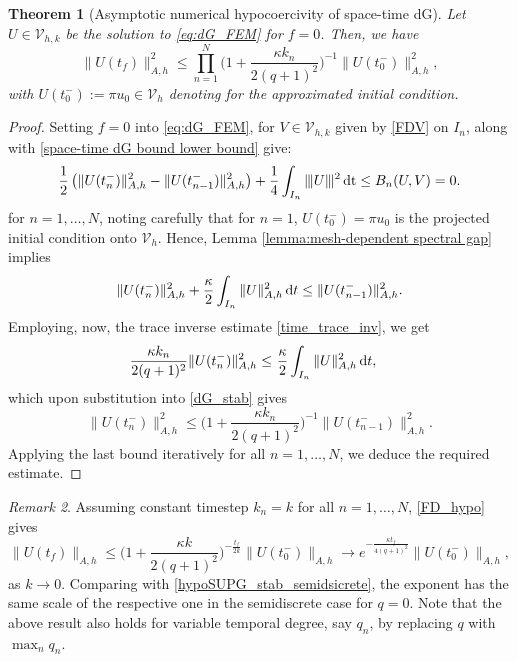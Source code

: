 \documentclass{amsart}
\newcommand{\norm}[2]{\|{#1}\|_{{#2}}}
\newcommand{\ud}{\,{\rm d}}
\newcommand{\ndg}[1]{|\kern-.03cm \|{#1}|\kern-.03cm \|}
\newcommand{\dt}{\,{\rm dt}}
\newtheorem{theorem}{Theorem}[section]
\theoremstyle{definition}
\theoremstyle{remark}
\newtheorem{remark}[theorem]{Remark}
\numberwithin{equation}{section}
\begin{document}
\begin{theorem}[Asymptotic numerical hypocoercivity of space-time dG]\label{thm:discreteEquilibriation}
	Let $U \in  {\mathcal{V}}_{h,k}$ be the solution to  \eqref{eq:dG_FEM} for $f=0$. Then, we have
    \begin{equation}\label{FD_hypo}
        \norm{U(t_f)}{A,h}^2\le \prod_{n=1}^N	\Big(1+\frac{\kappa	k_n}{2 (q+1)^2}	\Big)^{-1}\norm{U(t_{0}^-)}{A,h}^2,
    \end{equation}
   with  $U(t_0^-):=\pi u_0\in  {\mathcal{V}}_h$ denoting for the approximated initial condition.
\end{theorem}
\begin{proof}
Setting $f=0$  into  \eqref{eq:dG_FEM}, for $V\in  {\mathcal{V}}_{h,k}$ given by  \eqref{FDV} on $I_n$, along with \eqref{space-time dG bound lower bound} give:
\begin{equation}\label{dG_coer}
	\frac{1}{2}\left(
	\norm{U(t_n^-)}{A,h}^2  -	\norm{U(t_{n-1}^-)}{A,h}^2  \right)
	+ \frac{1}{4}\int_{I_n} \ndg{U}^2 \dt \leq B_n(U,V) = 0.
\end{equation}
for $n=1,\dots,N$, noting carefully that for $n=1$, $U(t_0^-)=\pi u_0$ is the projected initial condition onto $ {\mathcal{V}}_h$. Hence, Lemma \ref{lemma:mesh-dependent spectral gap} implies
\begin{equation}\label{dG_stab}
\norm{U(t_n^-)}{A,h}^2+\frac{\kappa}{2}\int _{I_n}\norm{U}{A,h}^2\ud t
\le \norm{U(t_{n-1}^-)}{A,h}^2.
\end{equation}
Employing, now, the trace inverse estimate \eqref{time_trace_inv}, we get
\[
\begin{aligned}
\frac{\kappa	k_n}{2 (q+1)^2}\norm{U(t_{n}^-)}{A,h}^2
	\le &\ \frac{\kappa}{2}\int _{I_n}\norm{U}{A,h}^2\ud t,
\end{aligned}
\]
which upon substitution into \eqref{dG_stab} gives
\[
\norm{U(t_n^-)}{A,h}^2\le \Big(1+\frac{\kappa	k_n}{2(q+1)^2} \Big)^{-1}\norm{U(t_{n-1}^-)}{A,h}^2.
\]
Applying the last bound iteratively for all $n=1,\dots,N$, we deduce the required estimate.
\end{proof}


\begin{remark}
Assuming constant timestep $k_n=k$ for all $n=1,\dots,N$, \eqref{FD_hypo} gives
\begin{equation}\label{eq:convergenceToEquilibriumForFullyDiscrete}
\norm{U(t_f)}{A,h}\le 	\Big(1+\frac{\kappa	k}{2 (q+1)^2}	\Big)^{-\frac{t_f}{2k}}\norm{U(t_{0}^-)}{A,h}\to  e^{-\frac{\kappa t_f}{4(q+1)^{2}}} \norm{U(t_{0}^-)}{A,h},
\end{equation}
as $k\to 0$. Comparing with \eqref{hypoSUPG_stab_semidsicrete}, the exponent has the same scale of the respective one in the semidiscrete case for $q=0$.
 {Note that the above result also holds for variable temporal degree, say $q_n$, by replacing $q$ with $\max_n {q_n}$.}
\end{remark}
\end{document}
